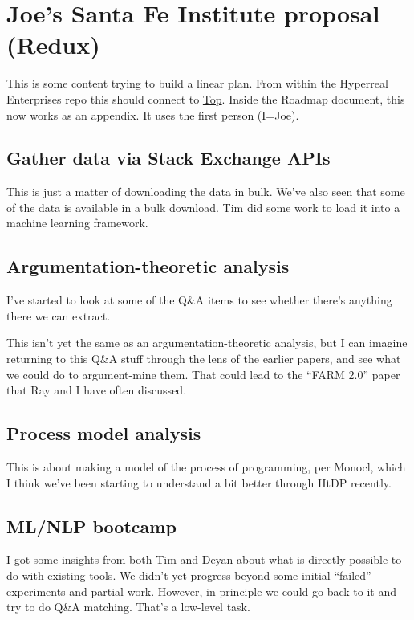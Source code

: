 \documentclass[11pt]{article}
\begin{document}
\section{Joe’s Santa Fe Institute proposal (Redux)}
\label{sec:org3cc1f9c}
This is some content trying to build a linear plan.  From within the
Hyperreal Enterprises repo this should connect to \hyperref[sec:org26689e2]{Top}.  Inside the
Roadmap document, this now works as an appendix.  It uses the first
person (I=Joe).

\subsection{Gather data via Stack Exchange APIs}
\label{sec:org870881e}

This is just a matter of downloading the data in bulk.  We’ve also seen that some of the data is available in a bulk download. Tim did some work to load it into a machine learning framework.
\subsection{Argumentation-theoretic analysis}
\label{sec:orga9c549c}

I’ve started to look at some of the Q\&A items to see whether there’s
anything there we can extract.

This isn’t yet the same as an argumentation-theoretic analysis, but I
can imagine returning to this Q\&A stuff through the lens of the
earlier papers, and see what we could do to argument-mine them.  That
could lead to the “FARM 2.0” paper that Ray and I have often
discussed.
\subsection{Process model analysis}
\label{sec:org5579334}

This is about making a model of the process of programming, per
Monocl, which I think we’ve been starting to understand a bit better
through HtDP recently.
\subsection{ML/NLP bootcamp}
\label{sec:org40cbfc3}

I got some insights from both Tim and Deyan about what is directly
possible to do with existing tools.  We didn’t yet progress beyond
some initial “failed” experiments and partial work. However, in
principle we could go back to it and try to do Q\&A matching.  That’s a
low-level task.
\end{document}
